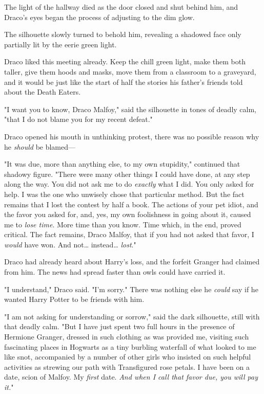 The light of the hallway died as the door closed and shut behind him, and 
Draco's eyes began the process of adjusting to the dim glow.

The silhouette slowly turned to behold him, revealing a shadowed face only 
partially lit by the eerie green light.

Draco liked this meeting already. Keep the chill green light, make them both 
taller, give them hoods and masks, move them from a classroom to a graveyard, 
and it would be just like the start of half the stories his father's friends 
told about the Death Eaters.

"I want you to know, Draco Malfoy," said the silhouette in tones of deadly 
calm, "that I do not blame you for my recent defeat."

Draco opened his mouth in unthinking protest, there was no possible reason why 
he \emph{should} be blamed---

"It was due, more than anything else, to my own stupidity," continued that 
shadowy figure. "There were many other things I could have done, at any step 
along the way. You did not ask me to do \emph{exactly} what I did. You only 
asked for help. I was the one who unwisely chose that particular method. But 
the fact remains that I lost the contest by half a book. The actions of your 
pet idiot, and the favor you asked for, and, yes, my own foolishness in going 
about it, caused me to \emph{lose time}. More time than you know. Time which, 
in the end, proved critical. The fact remains, Draco Malfoy, that if you had 
not asked that favor, I \emph{would} have won. And not{\ldots} instead{\ldots} 
\emph{lost}."

Draco had already heard about Harry's loss, and the forfeit Granger had claimed 
from him. The news had spread faster than owls could have carried it.

"I understand," Draco said. "I'm sorry." There was nothing else he \emph{could} 
say if he wanted Harry Potter to be friends with him.

"I am not asking for understanding or sorrow," said the dark silhouette, still 
with that deadly calm. "But I have just spent two full hours in the presence of 
Hermione Granger, dressed in such clothing as was provided me, visiting such 
fascinating places in Hogwarts as a tiny burbling waterfall of what looked to 
me like snot, accompanied by a number of other girls who insisted on such 
helpful activities as strewing our path with Transfigured rose petals. I have 
been on a date, scion of Malfoy. My \emph{first} date. \emph{And when I call 
that favor due, you will pay it.}"

